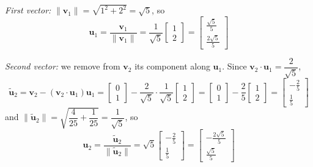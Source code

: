 \documentclass[]{article}
\begin{document}
	\textit{First vector:} $\|\mathbf{v}_1\| = \sqrt{1^2 + 2^2} = \sqrt{5}$, so
	$$\mathbf{u}_1 = \frac{\mathbf{v}_1}{\|\mathbf{v}_1\|} = \frac{1}{\sqrt{5}} \begin{bmatrix} 1 \\ 2 \end{bmatrix} = \begin{bmatrix} \frac{\sqrt{5}}{5} \\ \frac{2\sqrt{5}}{5} \end{bmatrix}$$

	\textit{Second vector:} we remove from $\mathbf{v}_2$ its component along $\mathbf{u}_1$. Since $\mathbf{v}_2 \cdot \mathbf{u}_1 = \dfrac{2}{\sqrt{5}}$,
	$$\tilde{\mathbf{u}}_2 = \mathbf{v}_2 - \left(\mathbf{v}_2 \cdot \mathbf{u}_1\right) \mathbf{u}_1
	= \begin{bmatrix} 0 \\ 1 \end{bmatrix} - \frac{2}{\sqrt{5}} \cdot \frac{1}{\sqrt{5}} \begin{bmatrix} 1 \\ 2 \end{bmatrix}
	= \begin{bmatrix} 0 \\ 1 \end{bmatrix} - \frac{2}{5} \begin{bmatrix} 1 \\ 2 \end{bmatrix}
	= \begin{bmatrix} -\frac{2}{5} \\ \frac{1}{5} \end{bmatrix}$$
	and $\|\tilde{\mathbf{u}}_2\| = \sqrt{\dfrac{4}{25} + \dfrac{1}{25}} = \dfrac{1}{\sqrt{5}}$, so
	$$\mathbf{u}_2 = \frac{\tilde{\mathbf{u}}_2}{\|\tilde{\mathbf{u}}_2\|} = \sqrt{5} \begin{bmatrix} -\frac{2}{5} \\ \frac{1}{5} \end{bmatrix} = \begin{bmatrix} -\frac{2\sqrt{5}}{5} \\ \frac{\sqrt{5}}{5} \end{bmatrix}$$
\end{document}
